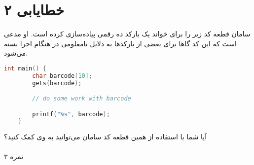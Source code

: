 \documentclass[../main.tex]{subfiles}
\begin{document}
\section{خطایابی ۲}
\paragraph{}
سامان قطعه کد زیر را برای خواند یک بارکد ده رقمی پیاده‌سازی کرده است.
او مدعی است که این کد گاها برای بعضی از بارکدها به دلایل نامعلومی در هنگام اجرا بسته می‌شود.

\begin{latin}
\begin{lstlisting}[language=c]
    int main() {
        char barcode[10];
        gets(barcode);

        // do some work with barcode

        printf("%s", barcode);
    }
\end{lstlisting}
\end{latin}

آیا شما با استفاده از همین قطعه کد سامان می‌توانید به وی کمک کنید؟

\paragraph{}
۳ نمره
\end{document}
